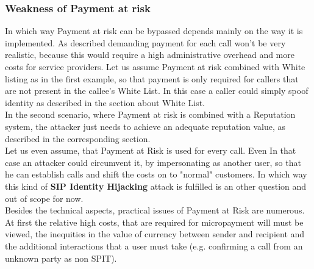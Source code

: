 \documentclass[final
	]{issa}
\begin{document}
\subsubsection{Weakness of Payment at risk}
In which way Payment at risk can be bypassed depends mainly on the way it is implemented. As described demanding payment for each call won't be very realistic, because this would require a high administrative overhead and more costs for service providers. Let us assume Payment at risk combined with White listing as in the first example, so that payment is only required for callers that are not present in the callee's White List. In this case a caller could simply spoof identity as described in the section about White List.\\ In the second scenario, where Payment at risk is combined with a Reputation system, the attacker just needs to achieve an adequate reputation value, as described in the corresponding section.\\ Let us even assume, that Payment at Risk is used for every call. Even In that case an attacker could circumvent it, by impersonating as another user, so that he can establish calls and shift the costs on to "normal" customers. In which way this kind of \textbf{SIP Identity Hijacking} attack is fulfilled is an other question and out of scope for now.\\ Besides the technical aspects, practical issues of Payment at Risk are numerous. At first the relative high costs, that are required for micropayment will must be viewed, the inequities in the value of currency between sender and recipient \cite{rfc:5039} and the additional interactions that a user must take (e.g. confirming a call from an unknown party as non SPIT).
\end{document}
